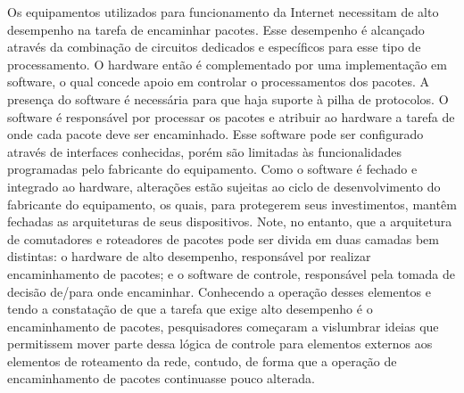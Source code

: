 \documentclass[	12pt, Times, openright, twoside, a4paper, english, brazil]{abntex2}
\begin{document}
Os equipamentos utilizados para funcionamento da Internet necessitam de alto desempenho na tarefa de encaminhar pacotes. Esse desempenho é alcançado através da combinação de circuitos dedicados e específicos para esse tipo de processamento. O hardware então é complementado por uma implementação em software, o qual concede apoio em controlar o processamentos dos pacotes. A presença do software é necessária para que haja suporte à pilha de protocolos. O software é responsável por processar os pacotes e atribuir ao hardware a tarefa de onde cada pacote deve ser encaminhado. Esse software pode ser configurado através de interfaces conhecidas, porém são limitadas às funcionalidades programadas pelo fabricante do equipamento. Como o software é fechado e integrado ao hardware, alterações estão sujeitas ao ciclo de desenvolvimento do fabricante do equipamento, os quais, para protegerem seus investimentos, mantêm fechadas as arquiteturas de seus dispositivos. Note, no entanto, que a arquitetura de comutadores e roteadores de pacotes pode ser divida em duas camadas bem distintas: o hardware de alto desempenho, responsável por realizar encaminhamento de pacotes; e o software de controle, responsável pela tomada de decisão de/para onde encaminhar. Conhecendo a operação desses elementos e tendo a constatação de que a tarefa que exige alto desempenho é o encaminhamento de pacotes, pesquisadores começaram a vislumbrar ideias que permitissem mover parte dessa lógica de controle para elementos externos aos elementos de roteamento da rede, contudo, de forma que a operação de encaminhamento de pacotes continuasse pouco alterada.
\end{document}
